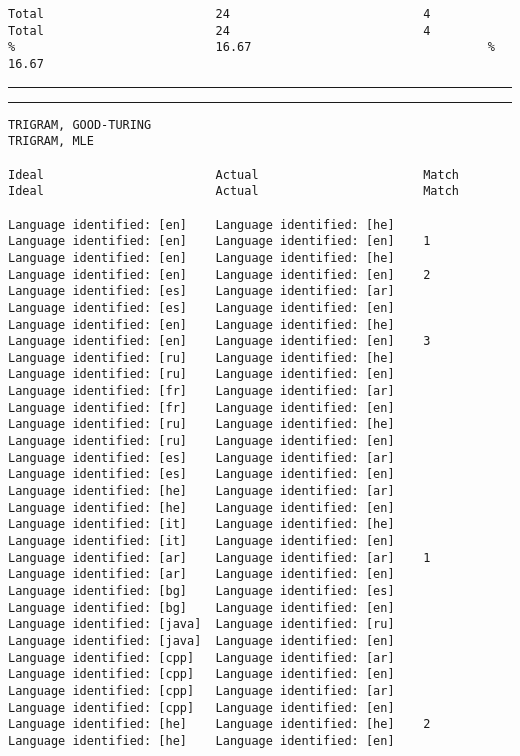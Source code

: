 \begin{verbatim}
Total                        24                           4        Total                        24                           4
%                            16.67                                 %                            16.67
\end{verbatim}
\vskip4pt\hrule


\tiny
\hrule\vskip4pt
\begin{verbatim}
TRIGRAM, GOOD-TURING                                               TRIGRAM, MLE

Ideal                        Actual                       Match    Ideal                        Actual                       Match

Language identified: [en]    Language identified: [he]             Language identified: [en]    Language identified: [en]    1
Language identified: [en]    Language identified: [he]             Language identified: [en]    Language identified: [en]    2
Language identified: [es]    Language identified: [ar]             Language identified: [es]    Language identified: [en]
Language identified: [en]    Language identified: [he]             Language identified: [en]    Language identified: [en]    3
Language identified: [ru]    Language identified: [he]             Language identified: [ru]    Language identified: [en]
Language identified: [fr]    Language identified: [ar]             Language identified: [fr]    Language identified: [en]
Language identified: [ru]    Language identified: [he]             Language identified: [ru]    Language identified: [en]
Language identified: [es]    Language identified: [ar]             Language identified: [es]    Language identified: [en]
Language identified: [he]    Language identified: [ar]             Language identified: [he]    Language identified: [en]
Language identified: [it]    Language identified: [he]             Language identified: [it]    Language identified: [en]
Language identified: [ar]    Language identified: [ar]    1        Language identified: [ar]    Language identified: [en]
Language identified: [bg]    Language identified: [es]             Language identified: [bg]    Language identified: [en]
Language identified: [java]  Language identified: [ru]             Language identified: [java]  Language identified: [en]
Language identified: [cpp]   Language identified: [ar]             Language identified: [cpp]   Language identified: [en]
Language identified: [cpp]   Language identified: [ar]             Language identified: [cpp]   Language identified: [en]
Language identified: [he]    Language identified: [he]    2        Language identified: [he]    Language identified: [en]

\end{verbatim}
